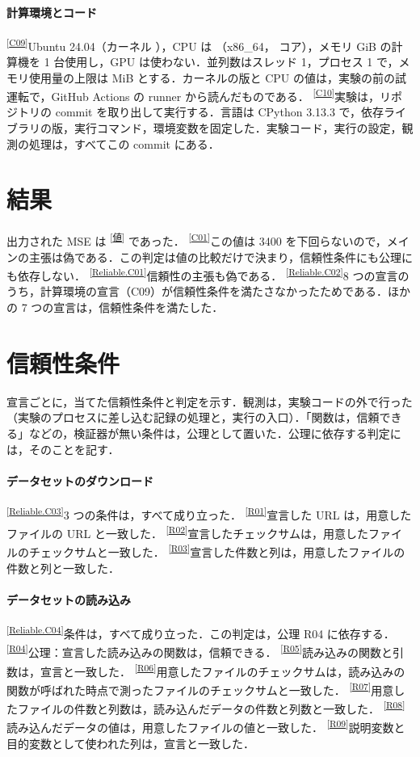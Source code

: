 \documentclass[9pt,a4paper,twocolumn]{ltjsarticle}
\newcommand{\repositoryurl}{https://github.com/auto-res2/formal-first-diabetes-regression-5}
\newcommand{\schemaurl}{\repositoryurl/blob/\SchemaCommit/formal/claims.json}
\newcommand{\cid}[1]{\textsuperscript{\textsf{\scriptsize[\href{\schemaurl\#L\csname line#1\endcsname}{#1}]}}}
\newcommand{\val}[1]{\textsuperscript{\textsf{\scriptsize[\href{\schemaurl\#L\csname line#1\endcsname}{値}]}}}
\newcommand{\code}[1]{\texttt{\small #1}}
\begin{document}
\paragraph{計算環境とコード}
\cid{C09}Ubuntu 24.04（カーネル \DeclaredKernelRelease），CPU は \DeclaredCpuModel（x86\_64，\LogicalCpuCount{} コア），メモリ \MemoryGib{} GiB の計算機を 1 台使用し，GPU は使わない．並列数はスレッド 1，プロセス 1 で，メモリ使用量の上限は \MemoryUsageLimit{} MiB とする．カーネルの版と CPU の値は，実験の前の試運転で，GitHub Actions の runner から読んだものである．
\cid{C10}実験は，リポジトリの commit \code{\RepositoryCommit} を取り出して実行する．言語は CPython 3.13.3 で，依存ライブラリの版，実行コマンド，環境変数を固定した．実験コード，実行の設定，観測の処理は，すべてこの commit にある．

\section{結果}
\label{sec:result}

出力された MSE は \TestMse\val{outputTestMse} であった．
\cid{C01}この値は 3400 を下回らないので，メインの主張は偽である．この判定は値の比較だけで決まり，信頼性条件にも公理にも依存しない．
\cid{Reliable.C01}信頼性の主張も偽である．
\cid{Reliable.C02}8 つの宣言のうち，計算環境の宣言（C09）が信頼性条件を満たさなかったためである．ほかの 7 つの宣言は，信頼性条件を満たした．

\section{信頼性条件}
\label{sec:reliability}

宣言ごとに，当てた信頼性条件と判定を示す．観測は，実験コードの外で行った（実験のプロセスに差し込む記録の処理と，実行の入口）．「関数は，信頼できる」などの，検証器が無い条件は，公理として置いた．公理に依存する判定には，そのことを記す．

\paragraph{データセットのダウンロード}
\cid{Reliable.C03}3 つの条件は，すべて成り立った．
\cid{R01}宣言した URL は，用意したファイルの URL と一致した．
\cid{R02}宣言したチェックサムは，用意したファイルのチェックサムと一致した．
\cid{R03}宣言した件数と列は，用意したファイルの件数と列と一致した．

\paragraph{データセットの読み込み}
\cid{Reliable.C04}条件は，すべて成り立った．この判定は，公理 R04 に依存する．
\cid{R04}公理：宣言した読み込みの関数は，信頼できる．
\cid{R05}読み込みの関数と引数は，宣言と一致した．
\cid{R06}用意したファイルのチェックサムは，読み込みの関数が呼ばれた時点で測ったファイルのチェックサムと一致した．
\cid{R07}用意したファイルの件数と列数は，読み込んだデータの件数と列数と一致した．
\cid{R08}読み込んだデータの値は，用意したファイルの値と一致した．
\cid{R09}説明変数と目的変数として使われた列は，宣言と一致した．
\end{document}
